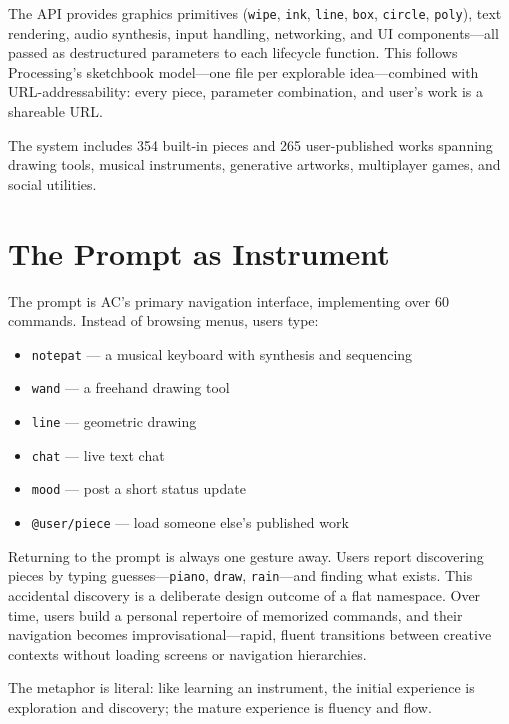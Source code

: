 \documentclass[manuscript,anonymous,review]{acmart}
\begin{document}
The API provides graphics primitives (\texttt{wipe}, \texttt{ink}, \texttt{line}, \texttt{box}, \texttt{circle}, \texttt{poly}), text rendering, audio synthesis, input handling, networking, and UI components---all passed as destructured parameters to each lifecycle function. This follows Processing's sketchbook model---one file per explorable idea---combined with URL-addressability: every piece, parameter combination, and user's work is a shareable URL.

The system includes 354 built-in pieces and 265 user-published works spanning drawing tools, musical instruments, generative artworks, multiplayer games, and social utilities.

\section{The Prompt as Instrument}

The prompt is AC's primary navigation interface, implementing over 60 commands. Instead of browsing menus, users type:

\begin{itemize}
  \item \texttt{notepat} --- a musical keyboard with synthesis and sequencing
  \item \texttt{wand} --- a freehand drawing tool
  \item \texttt{line} --- geometric drawing
  \item \texttt{chat} --- live text chat
  \item \texttt{mood} --- post a short status update
  \item \texttt{@user/piece} --- load someone else's published work
\end{itemize}

Returning to the prompt is always one gesture away. Users report discovering pieces by typing guesses---\texttt{piano}, \texttt{draw}, \texttt{rain}---and finding what exists. This accidental discovery is a deliberate design outcome of a flat namespace. Over time, users build a personal repertoire of memorized commands, and their navigation becomes improvisational---rapid, fluent transitions between creative contexts without loading screens or navigation hierarchies.

The metaphor is literal: like learning an instrument, the initial experience is exploration and discovery; the mature experience is fluency and flow.
\end{document}
